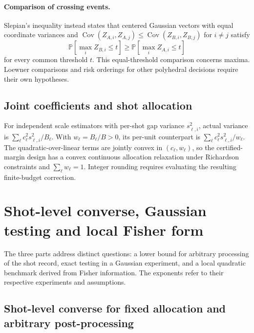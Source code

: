 \documentclass[a4paper,onecolumn,unpublished,nopdfoutputerror]{quantumarticle}
\theoremstyle{plain}
\theoremstyle{definition}
\newcommand{\Prob}{\mathbb{P}}
\newcommand{\Cov}{\operatorname{Cov}}
\newcommand{\1}{\mathbf{1}}
\begin{document}
\paragraph{Comparison of crossing events.}
Slepian's inequality \cite{Slepian1962} instead states that centered Gaussian vectors with equal coordinate variances and $\Cov(Z_{A,i},Z_{A,j})\le\Cov(Z_{B,i},Z_{B,j})$ for $i\ne j$ satisfy
\[
\Prob[\max_iZ_{B,i}\le t]\ge\Prob[\max_iZ_{A,i}\le t]
\]
for every common threshold $t$. This equal-threshold comparison concerns maxima. Loewner comparisons and risk orderings for other polyhedral decisions require their own hypotheses.

\subsection{Joint coefficients and shot allocation}
\label{app:joint_allocation}
For independent scale estimators with per-shot gap variance $s_{\ell,i}^2$, actual variance is $\sum_\ell c_\ell^2s_{\ell,i}^2/B_\ell$. With $w_\ell=B_\ell/B>0$, its per-unit counterpart is $\sum_\ell c_\ell^2s_{\ell,i}^2/w_\ell$. The quadratic-over-linear terms are jointly convex in $(c_\ell,w_\ell)$, so the certified-margin design has a convex continuous allocation relaxation under Richardson constraints and $\sum_\ell w_\ell=1$. Integer rounding requires evaluating the resulting finite-budget correction.

\section{Shot-level converse, Gaussian testing and local Fisher form}
\label{app:converse_proofs}

The three parts address distinct questions: a lower bound for arbitrary processing of the shot record, exact testing in a Gaussian experiment, and a local quadratic benchmark derived from Fisher information. The exponents refer to their respective experiments and assumptions.

\subsection{Shot-level converse for fixed allocation and arbitrary post-processing}
\end{document}
